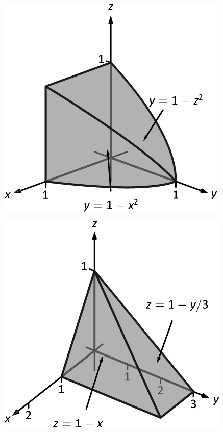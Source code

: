 \documentclass[10pt]{article}
\begin{document}
\includegraphics{fig13_06_ex_13_3DBW.pdf}
\texttt{}

\includegraphics{fig13_06_ex_14_3DBW.pdf}
\texttt{}
\end{document}
